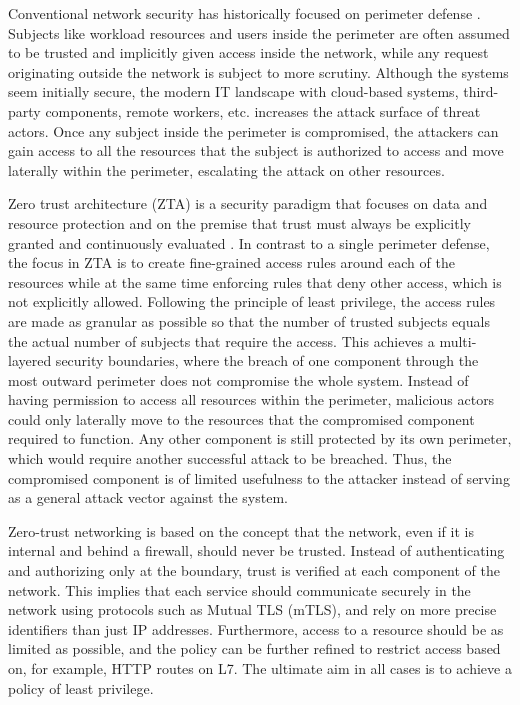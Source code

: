 \documentclass[english, 12pt, a4paper, sci, utf8, a-2b, online]{aaltothesis}
\begin{document}
Conventional network security has historically focused on perimeter defense \cite{kerman2020implementing}.
Subjects like workload resources and users inside the perimeter are often assumed to be trusted and implicitly given access inside the network, while any request originating outside the network is subject to more scrutiny.
Although the systems seem initially secure, the modern IT landscape with cloud-based systems, third-party components, remote workers, etc. increases the attack surface of threat actors.
Once any subject inside the perimeter is compromised, the attackers can gain access to all the resources that the subject is authorized to access and move laterally within the perimeter, escalating the attack on other resources.

Zero trust architecture (ZTA) is a security paradigm that focuses on data and resource protection and on the premise that trust must always be explicitly granted and continuously evaluated \cite{kerman2020implementing, rose2020zero}.
In contrast to a single perimeter defense, the focus in ZTA is to create fine-grained access rules around each of the resources while at the same time enforcing rules that deny other access, which is not explicitly allowed.
Following the principle of least privilege, the access rules are made as granular as possible so that the number of trusted subjects equals the actual number of subjects that require the access.
This achieves a multi-layered security boundaries, where the breach of one component through the most outward perimeter does not compromise the whole system.
Instead of having permission to access all resources within the perimeter, malicious actors could only laterally move to the resources that the compromised component required to function.
Any other component is still protected by its own perimeter, which would require another successful attack to be breached.
Thus, the compromised component is of limited usefulness to the attacker instead of serving as a general attack vector against the system.

Zero-trust networking is based on the concept that the network, even if it is internal and behind a firewall, should never be trusted.
Instead of authenticating and authorizing only at the boundary, trust is verified at each component of the network.
This implies that each service should communicate securely in the network using protocols such as Mutual TLS (mTLS), and rely on more precise identifiers than just IP addresses.
Furthermore, access to a resource should be as limited as possible, and the policy can be further refined to restrict access based on, for example, HTTP routes on L7.
The ultimate aim in all cases is to achieve a policy of least privilege.
\end{document}
